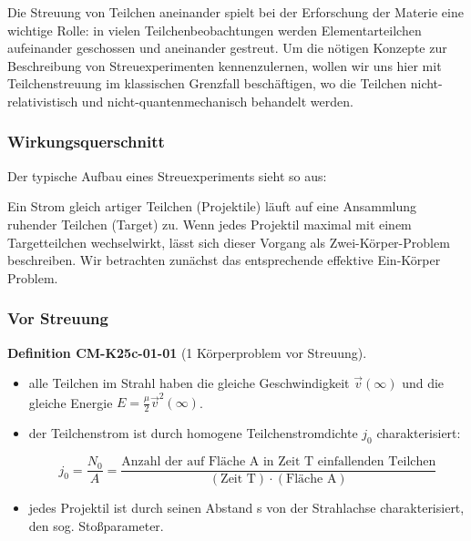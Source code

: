 \documentclass[10pt, letterpaper]{article}
\newcommand{\CustomHeading}[3]{%
  \par\medskip\noindent%
  \textbf{#1 #2} \textnormal{(#3)}.\enskip%
}
\newenvironment{DEF}[2]{\begin{unitbox}\CustomHeading{Definition}{#1}{#2}}{\end{unitbox}}
\begin{document}
Die Streuung von Teilchen aneinander spielt bei der Erforschung der Materie eine wichtige Rolle: in vielen Teilchenbeobachtungen werden Elementarteilchen aufeinander geschossen und aneinander gestreut. Um die nötigen Konzepte zur Beschreibung von Streuexperimenten kennenzulernen, wollen wir uns hier mit Teilchenstreuung im klassischen Grenzfall beschäftigen, wo die Teilchen nicht-relativistisch und nicht-quantenmechanisch behandelt werden.

\subsubsection{Wirkungsquerschnitt}

Der typische Aufbau eines Streuexperiments sieht so aus:

\begin{center}
\end{center}

Ein Strom gleich artiger Teilchen (Projektile) läuft auf eine Ansammlung ruhender Teilchen (Target) zu. Wenn jedes Projektil maximal mit einem Targetteilchen wechselwirkt, lässt sich dieser Vorgang als Zwei-Körper-Problem beschreiben. Wir betrachten zunächst das entsprechende effektive Ein-Körper Problem.
\subsubsection{Vor Streuung}

\begin{DEF}{CM-K25c-01-01}{1 Körperproblem vor Streuung}
\begin{itemize}
\item alle Teilchen im Strahl haben die gleiche Geschwindigkeit $\vec{v}(\infty)$ und die gleiche Energie $E = \frac{\mu}{2}\vec{v}^2(\infty)$.

\item der Teilchenstrom ist durch homogene Teilchenstromdichte $j_0$ charakterisiert:

\[
j_0 = \frac{N_0}{A} = \frac{\text{Anzahl der auf Fläche A in Zeit T}\text{ einfallenden Teilchen}}{(\text{Zeit T}) \cdot (\text{Fläche A})}
\]

\item jedes Projektil ist durch seinen Abstand s von der Strahlachse charakterisiert, den sog. Stoßparameter.
\end{itemize}
\end{DEF}
\end{document}
